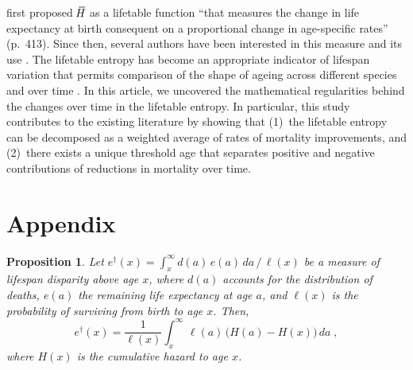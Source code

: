 \documentclass[a4paper,twoside, openright, 12pt, leqno]{article}
\newcommand*\xbar[1]{%
   \hbox{%
     \vbox{%
       \hrule height 0.5pt %
       \kern0.3ex%
       \hbox{%
         \kern-0.28em%
         \ensuremath{#1}%
         \kern-0.05em%
       }%
     }%
   }%
}
\newtheorem{theorem}{Proposition}
\begin{document}
 \cite{Keyfitz1977} first proposed $\,\xbar{H}$ as a lifetable function ``that measures the change in life expectancy at birth consequent on a proportional change in age-specific rates'' (p.~413). Since then, several authors have been interested in this measure and its use \citep{demetrius1978adaptive, Demetrius1979,mitra1978short,Goldman1986,Vaupel1986,Hakkert1987,hill1993entropy,Fernandez2015}. The lifetable entropy has become an appropriate indicator of lifespan variation that permits comparison of the shape of ageing across different species and over time \citep{baudisch2013pace,Wrycza2015}. In this article, we uncovered the mathematical regularities behind the changes over time in the lifetable entropy. In particular, this study contributes to the existing literature by showing that (1)~the lifetable entropy can be decomposed as a weighted average of rates of mortality improvements, and (2)~there exists a unique threshold age that separates positive and negative contributions of reductions in mortality over time.

% 



\newpage
\linespread{1}\normalsize






\newpage

\section*{Appendix}

\setcounter{equation}{0}
\renewcommand{\theequation}{A\arabic{equation}}

\begin{theorem}
 Let $e^\dagger(x)=\int_x^\infty d(a)\,e(a)\,da\,/\,\ell(x)$ be a measure of lifespan disparity above age $x$, where $d(a)$ accounts for the distribution of deaths, $e(a)$ the remaining life expectancy at age $a$, and $\ell(x)$ is the probability of surviving from birth to age $x$. Then,
 \begin{equation}
  e^\dagger(x)=\frac{1}{\ell(x)}\int_x^\infty\,\ell(a)\,\big(H(a)-H(x)\big)\,da\;,
  \label{eq:edaggerAppendix}
 \end{equation}
 where $H(x)$ is the cumulative hazard to age $x$.
 \label{prop1}
\end{theorem}
\end{document}
